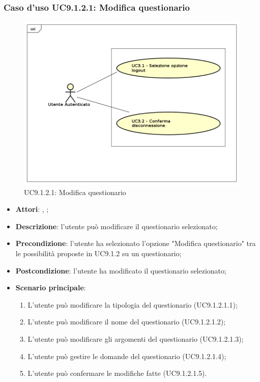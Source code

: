 			\subsubsection{Caso d'uso UC9.1.2.1: Modifica questionario}
			\label{UC9.1.2.1}
			\begin{figure}[h]
				\centering
			\includegraphics[scale=0.5,keepaspectratio]{UML/UC9.png}
				\caption{UC9.1.2.1: Modifica questionario}
			\end{figure}
			\FloatBarrier
			\begin{itemize}
				\item \textbf{Attori}: \uau, \uaupro;
				\item \textbf{Descrizione}: l'utente può modificare il questionario selezionato;
				\item \textbf{Precondizione}: l'utente ha selezionato l'opzione "Modifica questionario" tra le possibilità proposte in UC9.1.2 su un questionario;
				\item \textbf{Postcondizione}: l'utente ha modificato il questionario selezionato; 
				\item \textbf{Scenario principale}:
					\begin{enumerate}
						\item L'utente può modificare la tipologia del questionario (UC9.1.2.1.1);
						\item L'utente può modificare il nome del questionario (UC9.1.2.1.2);
						\item L'utente può modificare gli argomenti del questionario (UC9.1.2.1.3);
						\item L'utente può gestire le domande del questionario (UC9.1.2.1.4);
						\item L'utente può confermare le modifiche fatte (UC9.1.2.1.5).
					\end{enumerate}
			\end{itemize}
			
